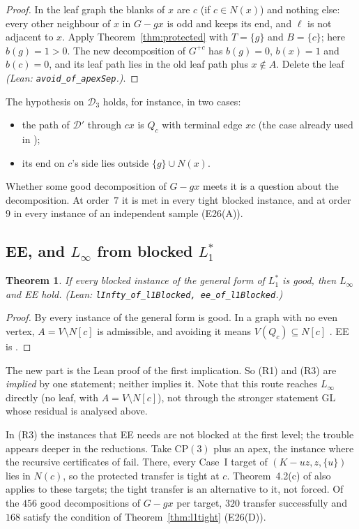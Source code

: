\documentclass[11pt]{amsart}
\newtheorem{theorem}{Theorem}[section]
\theoremstyle{definition}
\newcommand{\cD}{\mathcal D}
\newcommand{\lean}[1]{\quad\emph{(Lean: \texttt{#1}.)}}
\begin{document}
\begin{proof}
In the leaf graph the blanks of $x$ are $c$ (if $c\in N(x)$) and nothing else: every other neighbour
of $x$ in $G-gx$ is odd and keeps its end, and $\ell$ is not adjacent to $x$. Apply
Theorem~\ref{thm:protected} with $T=\{g\}$ and $B=\{c\}$; here $b(g)=1>0$. The new decomposition of
$G^{+c}$ has $b(g)=0$, $b(x)=1$ and $b(c)=0$, and its leaf path lies in the old leaf path plus
$x\notin A$. Delete the leaf \cite[Lemma~2.3(ii)]{L1S}\lean{avoid\_of\_apexSep}.
\end{proof}

The hypothesis on $\cD_3$ holds, for instance, in two cases:
\begin{itemize}
\item the path of $\cD'$ through $cx$ is $Q_c$ with terminal edge $xc$ (the case already used in
\cite{L1S});
\item its end on $c$'s side lies outside $\{g\}\cup N(x)$.
\end{itemize}
Whether some good decomposition of $G-gx$ meets it is a question about the decomposition. At
order~$7$ it is met in every tight blocked instance, and at order~$9$ in every instance of an
independent sample (E26(A)).

\subsection{EE, and \texorpdfstring{$L_\infty$}{L-infinity} from blocked \texorpdfstring{$L_1^*$}{L1*}}
\begin{theorem}\label{thm:linfty}
If every blocked instance of the general form of $L_1^*$ is good, then $L_\infty$ and EE hold.
\lean{lInfty\_of\_l1Blocked, ee\_of\_l1Blocked}
\end{theorem}

\begin{proof}
By \cite[Theorem~4.3]{L1S} every instance of the general form is good. In a graph with no even
vertex, $A=V\setminus N[c]$ is admissible, and avoiding it means $V(Q_c)\subseteq N[c]$
\cite[Proposition~3.1]{L1S}. EE is \cite[Corollary~4.4]{L1S}.
\end{proof}

The new part is the Lean proof of the first implication. So (R1) and (R3) are \emph{implied} by one
statement; neither implies it. Note that this route reaches $L_\infty$ directly (no leaf, with
$A=V\setminus N[c]$), not through the stronger statement GL whose residual is analysed above.

In (R3) the instances that EE needs are not blocked at the first level; the trouble appears deeper in
the reductions. Take $\mathrm{CP}(3)$ plus an apex, the instance where the recursive certificates of
\cite{L1S} fail. There, every Case~I target of $(K-uz,z,\{u\})$ lies in $N(c)$, so the protected
transfer is tight at $c$. Theorem~4.2(c) of \cite{L1S} also applies to these targets; the tight
transfer is an alternative to it, not forced. Of the $456$ good decompositions of $G-gx$ per target,
$320$ transfer successfully and $168$ satisfy the condition of Theorem~\ref{thm:l1tight} (E26(D)).
\end{document}
